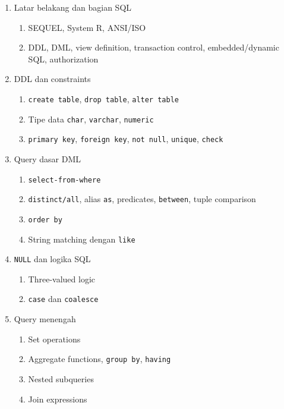 \begin{enumerate}
    \item \pwajib Latar belakang dan bagian SQL
    \begin{enumerate}
        \item \ppaham SEQUEL, System R, ANSI/ISO
        \item \pwajib DDL, DML, view definition, transaction control, embedded/dynamic SQL, authorization
    \end{enumerate}
    \item \pwajib DDL dan constraints
    \begin{enumerate}
        \item \pwajib \texttt{create table}, \texttt{drop table}, \texttt{alter table}
        \item \pwajib Tipe data \texttt{char}, \texttt{varchar}, \texttt{numeric}
        \item \pwajib \texttt{primary key}, \texttt{foreign key}, \texttt{not null}, \texttt{unique}, \texttt{check}
    \end{enumerate}
    \item \pwajib Query dasar DML
    \begin{enumerate}
        \item \pwajib \texttt{select-from-where}
        \item \pwajib \texttt{distinct/all}, alias \texttt{as}, predicates, \texttt{between}, tuple comparison
        \item \pwajib \texttt{order by}
        \item \pwajib String matching dengan \texttt{like}
    \end{enumerate}
    \item \pwajib \texttt{NULL} dan logika SQL
    \begin{enumerate}
        \item \pwajib Three-valued logic
        \item \pwajib \texttt{case} dan \texttt{coalesce}
    \end{enumerate}
    \item \pwajib Query menengah
    \begin{enumerate}
        \item \pwajib Set operations
        \item \pwajib Aggregate functions, \texttt{group by}, \texttt{having}
        \item \pwajib Nested subqueries
        \item \pwajib Join expressions

\end{enumerate}
\end{enumerate}
